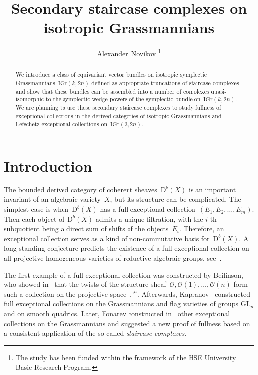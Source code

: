 \documentclass[a4paper]{article}
\newcommand{\GL}{\mathrm{GL}}
\newcommand{\Db}{{\mathrm{D}^b}}
\theoremstyle{remark}
\theoremstyle{definition}
\begin{document}
	
\title{Secondary staircase complexes on isotropic Grassmannians}
\author{Alexander~Novikov
\thanks{The study has been funded within the framework of the HSE University Basic Research Program.}}
\date{}


\setlength{\headheight}{15pt}

\maketitle{}

\begin{abstract} 
We introduce a class of equivariant vector bundles on isotropic symplectic Grassmannians~\(\mathrm{IGr}(k,2n)\)
defined as appropriate truncations of staircase complexes
and show that these bundles can be assembled into a number of complexes 
quasi-isomorphic to the symplectic wedge powers of the symplectic bundle on~\(\mathrm{IGr}(k,2n)\).
We are planning to use these secondary staircase complexes to study fullness of exceptional collections 
in the derived categories of isotropic Grassmannians and Lefschetz exceptional collections on~\(\mathrm{IGr}(3,2n)\).
\end{abstract}



\section{Introduction}

The bounded derived category of coherent sheaves~\(\Db(X)\) 
is an important invariant of an algebraic variety~\(X\), but its structure can be complicated. 
The simplest case is when~\(\Db(X)\) has a full exceptional collection~\((E_{1}, E_{2}, \ldots, E_{m})\). 
Then each object of~\(\Db(X)\) admits a unique filtration, with the \(i\)-th subquotient being a direct sum of shifts of the objects~\(E_i\). 
Therefore, an exceptional collection serves as a kind of non-commutative basis for~\(\Db(X)\). 
A long-standing conjecture predicts the existence of a full exceptional collection
on all projective homogeneous varieties of reductive algebraic groups, see~\cite{KuzPol}.

The first example of a full exceptional collection was constructed by Beilinson, 
who showed in~\cite{Beilinson1978} that the twists of the structure sheaf~\(\mathcal{O},\mathcal{O}(1), \ldots, \mathcal{O}(n)\) 
form such a collection on the projective space~\(\mathbb{P}^n\). 
Afterwards, Kapranov~\cite{kap84} constructed full exceptional collections 
on the Grassmannians and flag varieties of groups \(\GL_n\) and on smooth quadrics. 
Later, Fonarev constructed in~\cite{Fonarev_2013,F15} other exceptional collections on the Grassmannians
and suggested a new proof of fullness based on a consistent application of the so-called \emph{staircase complexes}.
\end{document}
